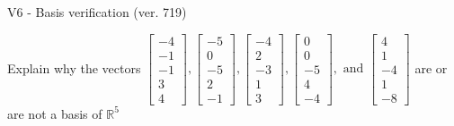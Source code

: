 \begin{exercise}
  \begin{exerciseTitle}V6 - Basis verification (ver. 719)\end{exerciseTitle}
  \begin{exerciseStatement}
    Explain why the vectors \(\left[\begin{array}{r}
-4 \\
-1 \\
-1 \\
3 \\
4
\end{array}\right] , \left[\begin{array}{r}
-5 \\
0 \\
-5 \\
2 \\
-1
\end{array}\right] , \left[\begin{array}{r}
-4 \\
2 \\
-3 \\
1 \\
3
\end{array}\right] , \left[\begin{array}{r}
0 \\
0 \\
-5 \\
4 \\
-4
\end{array}\right] , \text{ and } \left[\begin{array}{r}
4 \\
1 \\
-4 \\
1 \\
-8
\end{array}\right]\) are or are not a basis of \(\mathbb{R}^5\)	



\end{exerciseStatement}
\end{exercise}
